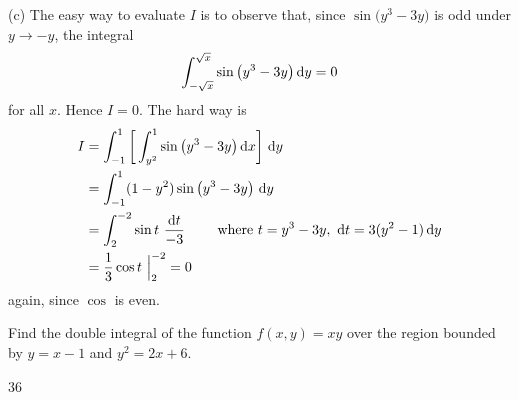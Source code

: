 \begin{solution}
(c) The easy way to evaluate $I$ is to observe that, since 
$\sin\big(y^3-3y\big)$ is odd under $y\rightarrow -y$, the integral
\begin{equation*}
\int_{-\sqrt{x}}^{\sqrt{x}} \sin\big(y^3-3y\big)\,\mathrm{d}y=0
\end{equation*}
for all $x$. Hence $I=0$. The hard way is 
\begin{align*}
I&=\int_{-1}^1\bigg[\int_{y^2}^1 \sin\big(y^3-3y\big)\,\mathrm{d}x\bigg]\ \mathrm{d}y\\
&=\int_{-1}^1 (1-y^2) \sin\big(y^3-3y\big)\ \mathrm{d}y\\
&=\int_2^{-2} \sin t\ \frac{\mathrm{d}t}{-3}
\qquad\hbox{ where }t=y^3-3y,\ \mathrm{d}t =3(y^2-1)\,\mathrm{d}y \\
&=\frac{1}{3}\cos t\ \Big|_2^{-2}=0
\end{align*}
again, since $\cos$ is even.
\end{solution}

\begin{question}[M200 2000A] %
Find the double integral of the function $f(x, y) = xy$
 over the region bounded by $y = x - 1$ and $y^2 = 2x + 6$.
\end{question}

%

\begin{answer}
$36$
\end{answer}

